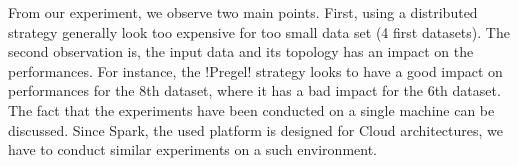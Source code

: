 From our experiment, we observe two main points. First, using a distributed strategy generally 
look too expensive for too small data set (4 first datasets). The second observation is, 
the input data and its topology has an impact on the performances. For instance, the !Pregel!
strategy looks to have a good impact on performances for the 8th dataset, where it has a bad 
impact for the 6th dataset. The fact that the experiments have been conducted on a single machine 
can be discussed. Since Spark, the used platform is designed for Cloud architectures, we have
to conduct similar experiments on a such environment.
